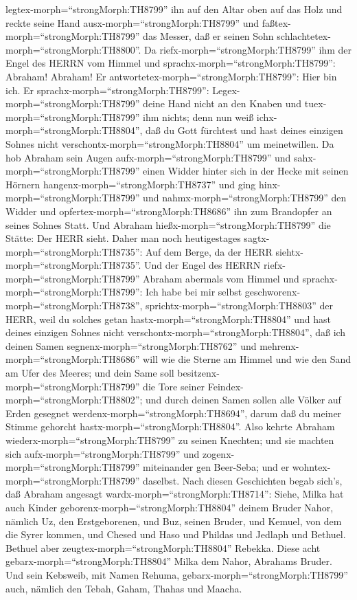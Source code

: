 legtex-morph=``strongMorph:TH8799'' ihn auf den Altar oben auf das Holz
 und reckte seine Hand ausx-morph=``strongMorph:TH8799''
und faßtex-morph=``strongMorph:TH8799'' das Messer, daß er seinen Sohn
schlachtetex-morph=``strongMorph:TH8800''.  Da
riefx-morph=``strongMorph:TH8799'' ihm der Engel des HERRN vom Himmel
und sprachx-morph=``strongMorph:TH8799'': Abraham! Abraham! Er
antwortetex-morph=``strongMorph:TH8799'': Hier bin ich.  Er
sprachx-morph=``strongMorph:TH8799'': Legex-morph=``strongMorph:TH8799''
deine Hand nicht an den Knaben und tuex-morph=``strongMorph:TH8799'' ihm
nichts; denn nun weiß ichx-morph=``strongMorph:TH8804'', daß du Gott
fürchtest und hast deines einzigen Sohnes nicht
verschontx-morph=``strongMorph:TH8804'' um meinetwillen. 
Da hob Abraham sein Augen aufx-morph=``strongMorph:TH8799'' und
sahx-morph=``strongMorph:TH8799'' einen Widder hinter sich in der Hecke
mit seinen Hörnern hangenx-morph=``strongMorph:TH8737'' und ging
hinx-morph=``strongMorph:TH8799'' und nahmx-morph=``strongMorph:TH8799''
den Widder und opfertex-morph=``strongMorph:TH8686'' ihn zum Brandopfer
an seines Sohnes Statt.  Und Abraham
hießx-morph=``strongMorph:TH8799'' die Stätte: Der HERR sieht. Daher man
noch heutigestages sagtx-morph=``strongMorph:TH8735'': Auf dem Berge, da
der HERR siehtx-morph=``strongMorph:TH8735''.  Und der
Engel des HERRN riefx-morph=``strongMorph:TH8799'' Abraham abermals vom
Himmel  und sprachx-morph=``strongMorph:TH8799'': Ich habe
bei mir selbst geschworenx-morph=``strongMorph:TH8738'',
sprichtx-morph=``strongMorph:TH8803'' der HERR, weil du solches getan
hastx-morph=``strongMorph:TH8804'' und hast deines einzigen Sohnes nicht
verschontx-morph=``strongMorph:TH8804'',  daß ich deinen
Samen segnenx-morph=``strongMorph:TH8762'' und
mehrenx-morph=``strongMorph:TH8686'' will wie die Sterne am Himmel und
wie den Sand am Ufer des Meeres; und dein Same soll
besitzenx-morph=``strongMorph:TH8799'' die Tore seiner
Feindex-morph=``strongMorph:TH8802'';  und durch deinen
Samen sollen alle Völker auf Erden gesegnet
werdenx-morph=``strongMorph:TH8694'', darum daß du meiner Stimme
gehorcht hastx-morph=``strongMorph:TH8804''.  Also kehrte
Abraham wiederx-morph=``strongMorph:TH8799'' zu seinen Knechten; und sie
machten sich aufx-morph=``strongMorph:TH8799'' und
zogenx-morph=``strongMorph:TH8799'' miteinander gen Beer-Seba; und er
wohntex-morph=``strongMorph:TH8799'' daselbst.  Nach diesen
Geschichten begab sich's, daß Abraham angesagt
wardx-morph=``strongMorph:TH8714'': Siehe, Milka hat auch Kinder
geborenx-morph=``strongMorph:TH8804'' deinem Bruder Nahor, 
nämlich Uz, den Erstgeborenen, und Buz, seinen Bruder, und Kemuel, von
dem die Syrer kommen,  und Chesed und Haso und Phildas und
Jedlaph und Bethuel.  Bethuel aber
zeugtex-morph=``strongMorph:TH8804'' Rebekka. Diese acht
gebarx-morph=``strongMorph:TH8804'' Milka dem Nahor, Abrahams Bruder.
 Und sein Kebsweib, mit Namen Rehuma,
gebarx-morph=``strongMorph:TH8799'' auch, nämlich den Tebah, Gaham,
Thahas und Maacha.

